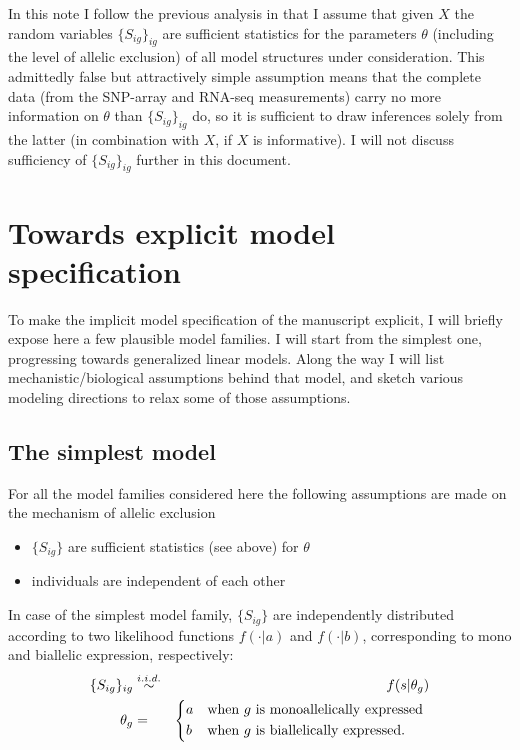 \documentclass[letterpaper]{article}
\begin{document}
In this note I follow the previous analysis in that I assume that given $X$ the random variables
$\{S_{ig}\}_{ig}$ are sufficient statistics for the parameters $\theta$ (including the level of
allelic exclusion) of all model structures under consideration.  This admittedly false but
attractively simple assumption means that the complete data (from the SNP-array and RNA-seq
measurements) carry no more information on $\theta$ than $\{S_{ig}\}_{ig}$ do, so it is sufficient
to draw inferences solely from the latter (in combination with $X$, if $X$ is informative).  I will
not discuss sufficiency of $\{S_{ig}\}_{ig}$ further in this document.

\section{Towards explicit model specification}

To make the implicit model specification of the manuscript explicit, I will briefly expose here a
few plausible model families.  I will start from the simplest one, progressing towards generalized
linear models.  Along the way I will list mechanistic/biological assumptions behind that model, and
sketch various modeling directions to relax some of those assumptions.

\subsection{The simplest model}

For all the model families considered here the following assumptions are made
on the mechanism of allelic exclusion
\begin{itemize}
\item $\{S_{ig}\}$ are sufficient statistics (see above) for $\theta$
\item individuals are independent of each other
\end{itemize}

In case of the simplest model family, $\{S_{ig}\}$ are independently
distributed according to two likelihood functions $f(\cdot|a)$ and
$f(\cdot|b)$, corresponding to mono and biallelic expression, respectively:
\begin{eqnarray}
\label{eq:two-level}
\{S_{ig}\}_{ig} &\overset{i.i.d.}{\sim}& f(s | \theta_g) \\
\label{eq:two-level-cases}
\theta_g &=&
\begin{dcases*}
a & when $g$ is monoallelically expressed \\
b & when $g$ is biallelically expressed.
\end{dcases*}
\end{eqnarray}
\end{document}
